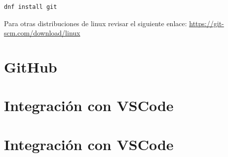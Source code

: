 \documentclass[11pt, oneside]{article}
\begin{document}
\begin{lstlisting}[language=bash,caption={Comando para instalar git en Fedora22 y superiores}]
dnf install git
\end{lstlisting}

Para otras distribuciones de linux revisar el siguiente enlace: \url{https://git-scm.com/download/linux}

\section{GitHub}


\section{Integración con VSCode}

\section{Integración con VSCode}
\end{document}
